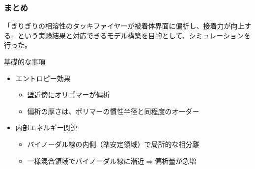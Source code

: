 \documentclass[12pt, dvipdfmx]{beamer}
\begin{document}
%
%		
%



%
\begin{frame}\frametitle{まとめ}
「ぎりぎりの相溶性のタッキファイヤーが被着体界面に偏析し、接着力が向上する」という実験結果と対応できるモデル構築を目的として、シミュレーションを行った。

\begin{block}{基礎的な事項}
\begin{itemize}
	\item エントロピー効果
	\begin{itemize}
		\item 壁近傍にオリゴマーが偏析
		\item 偏析の厚さは、ポリマーの慣性半径と同程度のオーダー
	\end{itemize}
	\item 内部エネルギー関連
	\begin{itemize}
		\item バイノーダル線の内側（準安定領域）で局所的な相分離
		\item 一様混合領域でバイノーダル線に漸近$\Rightarrow$偏析量が急増
	\end{itemize}
\end{itemize}
\end{block}

\end{frame}
\end{document}
